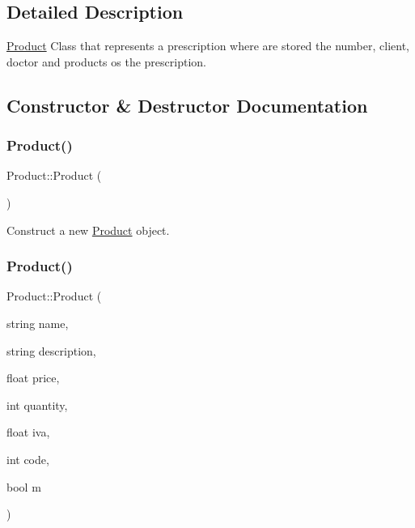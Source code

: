 \subsection{Detailed Description}
\hyperlink{classProduct}{Product} Class that represents a prescription where are stored the number, client, doctor and products os the prescription. 

\subsection{Constructor \& Destructor Documentation}
\mbox{\label{classProduct_a847c1d85e67ce387166a597579a55135}} 
\subsubsection{\texorpdfstring{Product()}{Product()}\hspace{0.1cm}{\footnotesize\ttfamily [1/2]}}
{\footnotesize\ttfamily Product\+::\+Product (\begin{DoxyParamCaption}{ }\end{DoxyParamCaption})}



Construct a new \hyperlink{classProduct}{Product} object. 

\mbox{\label{classProduct_af5787b56a6be5a1807ceb7999c6adb6a}} 
\subsubsection{\texorpdfstring{Product()}{Product()}\hspace{0.1cm}{\footnotesize\ttfamily [2/2]}}
{\footnotesize\ttfamily Product\+::\+Product (\begin{DoxyParamCaption}\item[{string}]{name,  }\item[{string}]{description,  }\item[{float}]{price,  }\item[{int}]{quantity,  }\item[{float}]{iva,  }\item[{int}]{code,  }\item[{bool}]{m }\end{DoxyParamCaption})}



